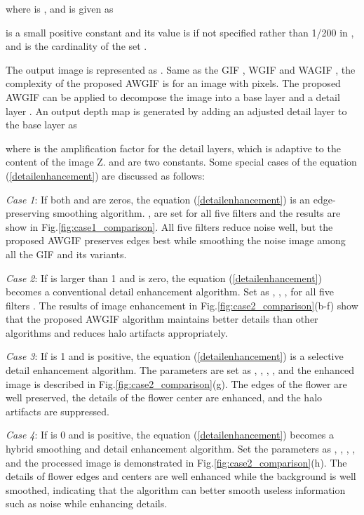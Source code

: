 \documentclass[a4paper,fleqn]{cas-dc}
\begin{document}
where  is , and  is given as \cite{chen2020weighted}

 is a small positive constant and its value is  if not specified rather than 1/200 in \cite{chen2020weighted}, and  is the cardinality of the set .

The output image is represented as . Same as the GIF \cite{he2013guided}, WGIF \cite{li2015weighted} and WAGIF \cite{chen2020weighted}, the complexity of the proposed AWGIF is  for an image with  pixels. The proposed AWGIF can be applied to decompose the image  into a base layer  and a detail layer . An output depth map  is generated by adding an adjusted detail layer to the base layer as

where  is the amplification factor for the detail layers,  which is adaptive to the content of the image Z.  and  are two constants. Some special cases of the equation (\ref{detailenhancement}) are discussed as follows:

{\it Case 1}: If both  and  are zeros, the equation (\ref{detailenhancement}) is an edge-preserving smoothing algorithm. ,  are set for all five filters  \cite{he2013guided,li2015weighted,chen2020weighted,lu2018effictive} and the results are show in Fig.\ref{fig:case1_comparison}. All five filters reduce noise well, but the proposed AWGIF preserves edges best while smoothing the noise image among all the GIF and its variants.

{\it Case 2}: If  is larger than 1 and  is zero, the equation (\ref{detailenhancement}) becomes a conventional detail enhancement algorithm. Set as , , ,  for all five filters \cite{he2013guided,li2015weighted,chen2020weighted,lu2018effictive}. The results of image enhancement in Fig.\ref{fig:case2_comparison}(b-f) show that the proposed AWGIF algorithm maintains better details than other algorithms and reduces halo artifacts appropriately. 

{\it Case 3}: If  is  1 and  is positive, the equation (\ref{detailenhancement}) is a selective detail enhancement algorithm. The parameters are set as , , , , and the enhanced image is described in Fig.\ref{fig:case2_comparison}(g). The edges of the flower are well preserved, the details of the flower center are enhanced, and the halo artifacts are suppressed.

{\it Case 4}: If  is  0 and  is positive, the equation (\ref{detailenhancement}) becomes a hybrid smoothing and detail enhancement algorithm. Set the parameters as , , , , and the processed image is demonstrated in Fig.\ref{fig:case2_comparison}(h). The details of flower edges and centers are well enhanced while the background is well smoothed, indicating that the algorithm can better smooth useless information such as noise while enhancing details.
\end{document}
